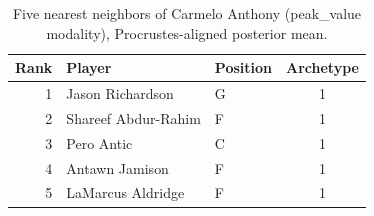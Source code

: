 \begin{table}[htbp]
  \centering\small
  \begin{tabular}{rllc}
    \toprule
    Rank & Player & Position & Archetype \\
    \midrule
    1 & Jason Richardson & G & 1 \\
    2 & Shareef Abdur-Rahim & F & 1 \\
    3 & Pero Antic & C & 1 \\
    4 & Antawn Jamison & F & 1 \\
    5 & LaMarcus Aldridge & F & 1 \\
    \bottomrule
  \end{tabular}
  \caption{Five nearest neighbors of Carmelo Anthony (peak_value modality), Procrustes-aligned posterior mean.}
  \label{tab:Carmelo_Anthony_neighbors_peak_value}
\end{table}


